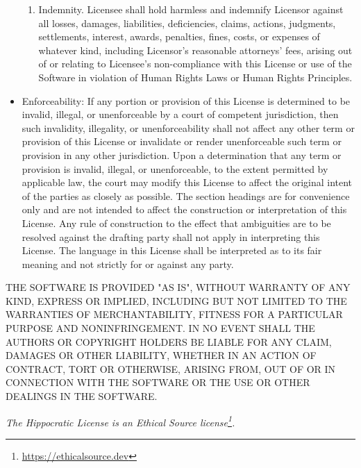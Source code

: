 \documentclass{scrbook}
\newcommand{\hreffoot}[2]{{#1}\footnote{\href{#2}{#2}}}
\begin{document}
\begin{itemize}
\begin{enumerate}
\item 

Indemnity. Licensee shall hold harmless and indemnify Licensor against
    all losses, damages, liabilities, deficiencies, claims, actions,
    judgments, settlements, interest, awards, penalties, fines, costs, or
    expenses of whatever kind, including Licensor's reasonable attorneys'
    fees, arising out of or relating to Licensee's non-compliance with this
    License or use of the Software in violation of Human Rights Laws or
    Human Rights Principles.



\end{enumerate}



\item 

Enforceability: If any portion or provision of this License is determined to
     be invalid, illegal, or unenforceable by a court of competent jurisdiction,
     then such invalidity, illegality, or unenforceability shall not affect any
     other term or provision of this License or invalidate or render
     unenforceable such term or provision in any other jurisdiction. Upon a
     determination that any term or provision is invalid, illegal, or
     unenforceable, to the extent permitted by applicable law, the court may
     modify this License to affect the original intent of the parties as closely
     as possible. The section headings are for convenience only and are not
     intended to affect the construction or interpretation of this License. Any
     rule of construction to the effect that ambiguities are to be resolved
     against the drafting party shall not apply in interpreting this
     License. The language in this License shall be interpreted as to its fair
     meaning and not strictly for or against any party.



\end{itemize}


THE SOFTWARE IS PROVIDED "AS IS", WITHOUT WARRANTY OF ANY KIND, EXPRESS OR
IMPLIED, INCLUDING BUT NOT LIMITED TO THE WARRANTIES OF MERCHANTABILITY, FITNESS
FOR A PARTICULAR PURPOSE AND NONINFRINGEMENT. IN NO EVENT SHALL THE AUTHORS OR
COPYRIGHT HOLDERS BE LIABLE FOR ANY CLAIM, DAMAGES OR OTHER LIABILITY, WHETHER
IN AN ACTION OF CONTRACT, TORT OR OTHERWISE, ARISING FROM, OUT OF OR IN
CONNECTION WITH THE SOFTWARE OR THE USE OR OTHER DEALINGS IN THE SOFTWARE.


\emph{The Hippocratic License is an \hreffoot{Ethical Source license}{https://ethicalsource.dev}.}
\end{document}
